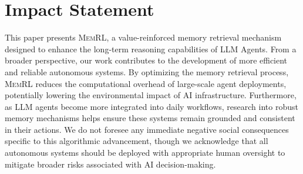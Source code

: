\documentclass{article}
\theoremstyle{plain}
\theoremstyle{definition}
\theoremstyle{remark}
\begin{document}


\section*{Impact Statement}
This paper presents \textsc{MemRL}, a value-reinforced memory retrieval mechanism designed to enhance the long-term reasoning capabilities of LLM Agents. From a broader perspective, our work contributes to the development of more efficient and reliable autonomous systems. By optimizing the memory retrieval process, \textsc{MemRL} reduces the computational overhead of large-scale agent deployments, potentially lowering the environmental impact of AI infrastructure. Furthermore, as LLM agents become more integrated into daily workflows, research into robust memory mechanisms helps ensure these systems remain grounded and consistent in their actions. We do not foresee any immediate negative social consequences specific to this algorithmic advancement, though we acknowledge that all autonomous systems should be deployed with appropriate human oversight to mitigate broader risks associated with AI decision-making.
\end{document}
